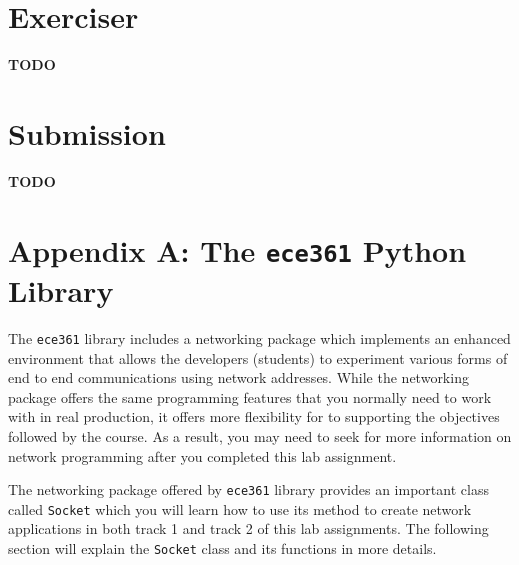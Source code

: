 \documentclass[11pt]{article}
\begin{document}
\section{Exerciser}
\label{sec:exercise}
\textbf{TODO}

\section{Submission}
\label{sec:submission}
\textbf{TODO}

\newpage
\section{Appendix A: The \texttt{ece361} Python Library}
\label{sec:appendix-ece361-lib}
The \texttt{ece361} library includes a networking package which implements an enhanced environment that allows the developers (students) to experiment various forms of end to end communications using network addresses. While the networking package offers the same programming features that you normally need to work with in real production, it offers more flexibility for to supporting the objectives followed by the course. As a result, you may need to seek for more information on network programming after you completed this lab assignment. 

The networking package offered by \texttt{ece361} library provides an important class called \texttt{Socket} which you will learn how to use its method to create network applications in both track 1 and track 2 of this lab assignments. The following section will explain the \texttt{Socket} class and its functions in more details.

\end{document}
